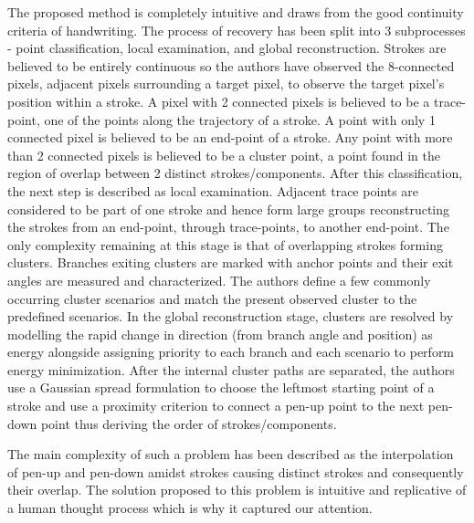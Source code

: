 \documentclass[10pt,twocolumn,letterpaper]{article}
\begin{document}
The proposed method is completely intuitive and draws from the good continuity criteria of handwriting. The process of recovery has been split into 3 subprocesses - point classification, local examination, and global reconstruction.
Strokes are believed to be entirely continuous so the authors have observed the 8-connected pixels, adjacent pixels surrounding a target pixel, to observe the target pixel's position within a stroke. A pixel with 2 connected pixels is believed to be a trace-point, one of the points along the trajectory of a stroke. A point with only 1 connected pixel is believed to be an end-point of a stroke. Any point with more than 2 connected pixels is believed to be a cluster point, a point found in the region of overlap between 2 distinct strokes/components.
After this classification, the next step is described as local examination. Adjacent trace points are considered to be part of one stroke and hence form large groups reconstructing the strokes from an end-point, through trace-points, to another end-point. The only complexity remaining at this stage is that of overlapping strokes forming clusters. Branches exiting clusters are marked with anchor points and their exit angles are measured and characterized. The authors define a few commonly occurring cluster scenarios and match the present observed cluster to the predefined scenarios.
In the global reconstruction stage, clusters are resolved by modelling the rapid change in direction (from branch angle and position) as energy alongside assigning priority to each branch and each scenario to perform energy minimization. After the internal cluster paths are separated, the authors use a Gaussian spread formulation to choose the leftmost starting point of a stroke and use a proximity criterion to connect a pen-up point to the next pen-down point thus deriving the order of strokes/components.

The main complexity of such a problem has been described as the interpolation of pen-up and pen-down amidst strokes causing distinct strokes and consequently their overlap. The solution proposed to this problem is intuitive and replicative of a human thought process which is why it captured our attention.

\end{document}
